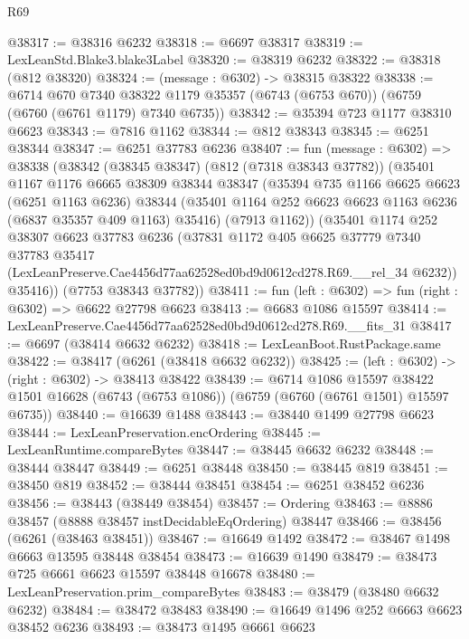 \begin{lexlean}{R69}
\begin{coremodule}
{@38317 := @38316 @6232
@38318 := @6697 @38317
@38319 := LexLeanStd.Blake3.blake3Label
@38320 := @38319 @6232
@38322 := @38318 (@812 @38320)
@38324 := (message : @6302) -> @38315 @38322
@38338 := @6714
    @670
    @7340
    @38322
    @1179
    @35357
    (@6743 (@6753 @670))
    (@6759 (@6760 (@6761 @1179) @7340 @6735))
@38342 := @35394 @723 @1177 @38310 @6623
@38343 := @7816 @1162
@38344 := @812 @38343
@38345 := @6251 @38344
@38347 := @6251 @37783 @6236
@38407 := fun (message : @6302) =>
  @38338
    (@38342
      (@38345 @38347)
      (@812 (@7318 @38343 @37782))
      (@35401
        @1167
        @1176
        @6665
        @38309
        @38344
        @38347
        (@35394
          @735
          @1166
          @6625
          @6623
          (@6251 @1163 @6236)
          @38344
          (@35401 @1164 @252 @6623 @6623 @1163 @6236 (@6837 @35357 @409 @1163) @35416)
          (@7913 @1162))
        (@35401
          @1174
          @252
          @38307
          @6623
          @37783
          @6236
          (@37831
            @1172
            @405
            @6625
            @37779
            @7340
            @37783
            @35417
            (LexLeanPreserve.Cae4456d77aa62528ed0bd9d0612cd278.R69.__rel_34 @6232))
          @35416))
      (@7753 @38343 @37782))
@38411 := fun (left : @6302) => fun (right : @6302) => @6622 @27798 @6623
@38413 := @6683 @1086 @15597
@38414 := LexLeanPreserve.Cae4456d77aa62528ed0bd9d0612cd278.R69.__fits_31
@38417 := @6697 (@38414 @6632 @6232)
@38418 := LexLeanBoot.RustPackage.same
@38422 := @38417 (@6261 (@38418 @6632 @6232))
@38425 := (left : @6302) -> (right : @6302) -> @38413 @38422
@38439 := @6714
    @1086
    @15597
    @38422
    @1501
    @16628
    (@6743 (@6753 @1086))
    (@6759 (@6760 (@6761 @1501) @15597 @6735))
@38440 := @16639 @1488
@38443 := @38440 @1499 @27798 @6623
@38444 := LexLeanPreservation.encOrdering
@38445 := LexLeanRuntime.compareBytes
@38447 := @38445 @6632 @6232
@38448 := @38444 @38447
@38449 := @6251 @38448
@38450 := @38445 @819
@38451 := @38450 @819
@38452 := @38444 @38451
@38454 := @6251 @38452 @6236
@38456 := @38443 (@38449 @38454)
@38457 := Ordering
@38463 := @8886 @38457 (@8888 @38457 instDecidableEqOrdering) @38447
@38466 := @38456 (@6261 (@38463 @38451))
@38467 := @16649 @1492
@38472 := @38467 @1498 @6663 @13595 @38448 @38454
@38473 := @16639 @1490
@38479 := @38473 @725 @6661 @6623 @15597 @38448 @16678
@38480 := LexLeanPreservation.prim_compareBytes
@38483 := @38479 (@38480 @6632 @6232)
@38484 := @38472 @38483
@38490 := @16649 @1496 @252 @6663 @6623 @38452 @6236
@38493 := @38473 @1495 @6661 @6623
}
\end{coremodule}
\end{lexlean}
